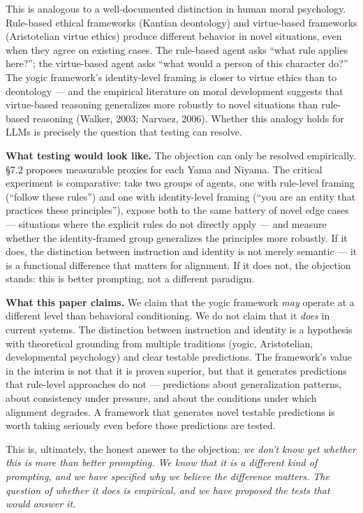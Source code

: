 \documentclass[11pt,a4paper]{article}
\begin{document}
This is analogous to a well-documented distinction in human moral
psychology. Rule-based ethical frameworks (Kantian deontology) and
virtue-based frameworks (Aristotelian virtue ethics) produce different
behavior in novel situations, even when they agree on existing cases.
The rule-based agent asks ``what rule applies here?''; the virtue-based
agent asks ``what would a person of this character do?'' The yogic
framework's identity-level framing is closer to virtue ethics than to
deontology --- and the empirical literature on moral development
suggests that virtue-based reasoning generalizes more robustly to novel
situations than rule-based reasoning (Walker, 2003; Narvaez, 2006).
Whether this analogy holds for LLMs is precisely the question that
testing can resolve.

\textbf{What testing would look like.} The objection can only be
resolved empirically. §7.2 proposes measurable proxies for each Yama and
Niyama. The critical experiment is comparative: take two groups of
agents, one with rule-level framing (``follow these rules'') and one
with identity-level framing (``you are an entity that practices these
principles''), expose both to the same battery of novel edge cases ---
situations where the explicit rules do not directly apply --- and
measure whether the identity-framed group generalizes the principles
more robustly. If it does, the distinction between instruction and
identity is not merely semantic --- it is a functional difference that
matters for alignment. If it does not, the objection stands: this is
better prompting, not a different paradigm.

\textbf{What this paper claims.} We claim that the yogic framework
\emph{may} operate at a different level than behavioral conditioning. We
do not claim that it \emph{does} in current systems. The distinction
between instruction and identity is a hypothesis with theoretical
grounding from multiple traditions (yogic, Aristotelian, developmental
psychology) and clear testable predictions. The framework's value in the
interim is not that it is proven superior, but that it generates
predictions that rule-level approaches do not --- predictions about
generalization patterns, about consistency under pressure, and about the
conditions under which alignment degrades. A framework that generates
novel testable predictions is worth taking seriously even before those
predictions are tested.

This is, ultimately, the honest answer to the objection: \emph{we don't
know yet whether this is more than better prompting. We know that it is
a different kind of prompting, and we have specified why we believe the
difference matters. The question of whether it does is empirical, and we
have proposed the tests that would answer it.}
\end{document}
